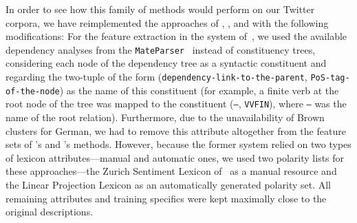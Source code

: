 In order to see how this family of methods would perform on our
Twitter corpora, we have reimplemented the approaches of
\citet{Gamon:04}, \citet{Mohammad:13}, and \citet{Guenther:14} with
the following modifications: For the feature extraction in the system
of~\citet{Gamon:04}, we used the available dependency analyses from
the \texttt{MateParser}~\cite{Bohnet:09} instead of constituency
trees, considering each node of the dependency tree as a syntactic
constituent and regarding the two-tuple of the form
(\texttt{dependency-link-to-the-parent}, \texttt{PoS-tag-of-the-node})
as the name of this constituent (for example, a finite verb at the
root node of the tree was mapped to the constituent (\texttt{--},
\texttt{VVFIN}), where \texttt{--} was the name of the root relation).
Furthermore, due to the unavailability of Brown clusters for German,
we had to remove this attribute altogether from the feature sets of
\citeauthor{Mohammad:13}'s and \citeauthor{Guenther:14}'s methods.
However, because the former system relied on two types of lexicon
attributes---manual and automatic ones, we used two polarity lists for
these approaches---the Zurich Sentiment Lexicon
of~\citet{Clematide:10} as a manual resource and the Linear Projection
Lexicon as an automatically generated polarity set.  All remaining
attributes and training specifics were kept maximally close to the
original descriptions.

